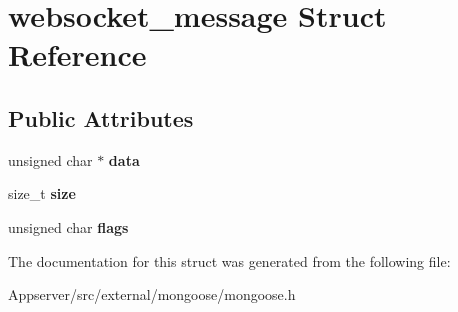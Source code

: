 \hypertarget{structwebsocket__message}{}\section{websocket\+\_\+message Struct Reference}
\label{structwebsocket__message}
\subsection*{Public Attributes}
\begin{DoxyCompactItemize}
\item 
unsigned char $\ast$ {\bfseries data}\hypertarget{structwebsocket__message_aeb8922c34831455b764d83083ae39968}{}\label{structwebsocket__message_aeb8922c34831455b764d83083ae39968}

\item 
size\+\_\+t {\bfseries size}\hypertarget{structwebsocket__message_af7ae89c0cba9566b64a47d40c5ea700a}{}\label{structwebsocket__message_af7ae89c0cba9566b64a47d40c5ea700a}

\item 
unsigned char {\bfseries flags}\hypertarget{structwebsocket__message_a72b32c83b4a065faac7ae28802a5adf1}{}\label{structwebsocket__message_a72b32c83b4a065faac7ae28802a5adf1}

\end{DoxyCompactItemize}


The documentation for this struct was generated from the following file\+:\begin{DoxyCompactItemize}
\item 
Appserver/src/external/mongoose/mongoose.\+h\end{DoxyCompactItemize}
